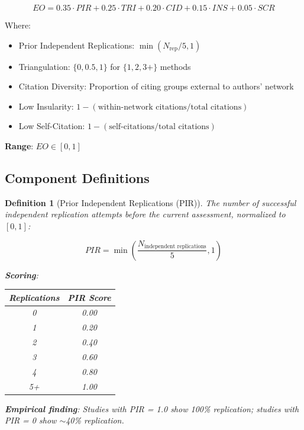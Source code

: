 \documentclass[11pt,a4paper]{article}
\newtheorem{definition}{Definition}[section]
\begin{document}
\begin{formulabox}[title={EO-Score (Epistemic Openness Score)}]
\begin{equation}
\boxed{EO = 0.35 \cdot PIR + 0.25 \cdot TRI + 0.20 \cdot CID + 0.15 \cdot INS + 0.05 \cdot SCR}
\label{eq:eoscore}
\end{equation}

Where:
\begin{itemize}[leftmargin=2cm]
    \item[\textbf{PIR}] Prior Independent Replications: $\min(N_{\text{rep}} / 5, 1)$
    \item[\textbf{TRI}] Triangulation: $\{0, 0.5, 1\}$ for $\{1, 2, 3+\}$ methods
    \item[\textbf{CID}] Citation Diversity: Proportion of citing groups external to authors' network
    \item[\textbf{INS}] Low Insularity: $1 - (\text{within-network citations} / \text{total citations})$
    \item[\textbf{SCR}] Low Self-Citation: $1 - (\text{self-citations} / \text{total citations})$
\end{itemize}

\textbf{Range}: $EO \in [0, 1]$
\end{formulabox}

\subsection{Component Definitions}

\begin{definition}[Prior Independent Replications (PIR)]
\label{def:pir}
The number of successful independent replication attempts before the current assessment, normalized to $[0, 1]$:

\begin{equation}
PIR = \min\left(\frac{N_{\text{independent replications}}}{5}, 1\right)
\end{equation}

\textbf{Scoring}:
\begin{center}
\begin{tabular}{cc}
\toprule
\textbf{Replications} & \textbf{PIR Score} \\
\midrule
0 & 0.00 \\
1 & 0.20 \\
2 & 0.40 \\
3 & 0.60 \\
4 & 0.80 \\
5+ & 1.00 \\
\bottomrule
\end{tabular}
\end{center}

\textbf{Empirical finding}: Studies with PIR = 1.0 show 100\% replication; studies with PIR = 0 show $\sim$40\% replication.
\end{definition}
\end{document}
